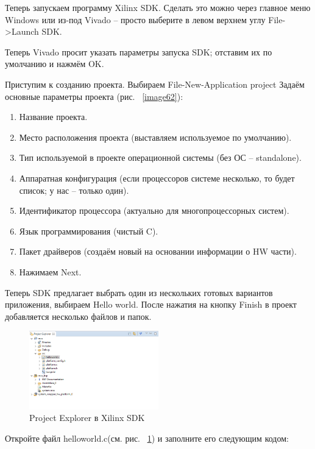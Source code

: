 \documentclass[a4paper,oneside ,10pt]{extreport}
\begin{document}
Теперь запускаем программу Xilinx SDK. Сделать это можно через главное 
меню Windows или из-под Vivado – просто выберите в левом верхнем углу File->Launch SDK.

Теперь Vivado просит указать параметры запуска SDK; отставим их по 
умолчанию и нажмём OK.

Приступим к созданию проекта. Выбираем File-New-Application project
Задаём основные параметры проекта (рис. ~\ref{image62}):

\begin{enumerate}
	\item Название проекта.
	\item Место расположения проекта (выставляем используемое по 
умолчанию).
	\item Тип используемой в проекте операционной системы (без ОС –
standalone).
	\item Аппаратная конфигурация (если процессоров системе несколько, то 
будет список; у нас – только один).
	\item Идентификатор процессора (актуально для многопроцессорных систем).
	\item Язык программирования (чистый C).
	\item Пакет драйверов (создаём новый на основании информации о HW части).
	\item Нажимаем Next.
\end{enumerate}

Теперь SDK предлагает выбрать один из нескольких готовых вариантов 
приложения, выбираем Hello world. После нажатия на кнопку Finish в 
проект добавляется несколько файлов и папок.

\begin{figure}[!ht]
	\centering
	\includegraphics[width=0.5\textwidth]{image/SDK_Exp.png}
	\caption{Project Explorer в Xilinx SDK}
	\label{SDK_Exp}
\end{figure}

Откройте файл helloworld.c(см. рис. ~\ref{SDK_Exp}) и заполните его следующим кодом:
\end{document}
